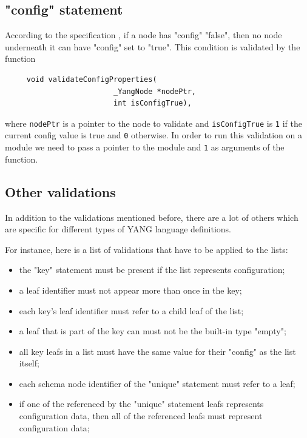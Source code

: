 \documentclass[conference]{IEEEtran}
\begin{document}
\subsection{"config" statement}
According to the specification \cite{bib4}, if a node has "config" "false", then no node underneath it can have "config" set to "true".
This condition is validated by the function
\small
\begin{verbatim}
     void validateConfigProperties(
                         _YangNode *nodePtr, 
                         int isConfigTrue),
\end{verbatim}
\normalsize
where \texttt{nodePtr} is a pointer to the node to validate and \texttt{isConfigTrue} is \texttt{1} if the current config value is true and \texttt{0} otherwise.
In order to run this validation on a module we need to pass a pointer to the module and \texttt{1} as arguments of the function. 

\subsection{Other validations}
In addition to the validations mentioned before, there are a lot of others which are specific for different types of YANG language definitions.  

For instance, here is a list of validations that have to be applied to the lists:
\begin{itemize}
\item the "key" statement must be present if the list represents configuration;
\item a leaf identifier must not appear more than once in the key;
\item each key's leaf identifier must refer to a child leaf of the list;
\item a leaf that is part of the key can must not be the built-in type "empty";
\item all key leafs in a list must have the same value for their "config" as the list itself;
\item each schema node identifier of the "unique" statement must refer to a leaf;
\item if one of the referenced by the "unique" statement leafs represents configuration data, then all of the referenced leafs must represent configuration data;
\end{itemize}
\end{document}
